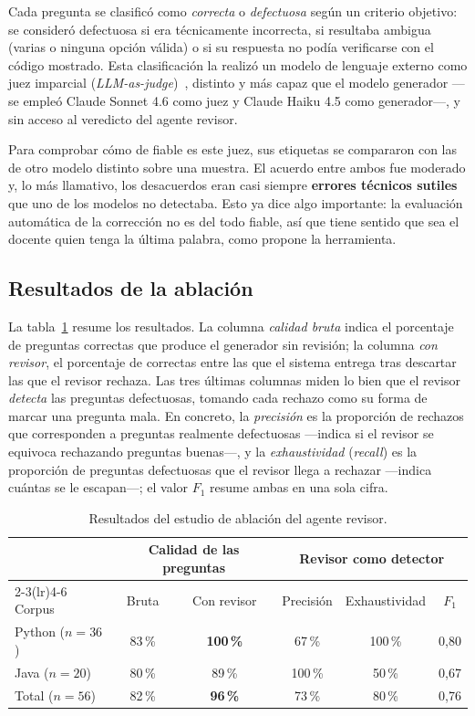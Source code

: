 Cada pregunta se clasificó como \emph{correcta} o \emph{defectuosa} según un
criterio objetivo: se consideró defectuosa si era técnicamente incorrecta, si
resultaba ambigua (varias o ninguna opción válida) o si su respuesta no podía
verificarse con el código mostrado. Esta clasificación la realizó un modelo de
lenguaje externo como juez imparcial
(\emph{LLM-as-judge})~\parencite{zheng2023llmjudge}, distinto y más capaz que el
modelo generador ---se empleó Claude Sonnet 4.6 como juez y Claude Haiku 4.5
como generador---, y sin acceso al veredicto del agente revisor.

Para comprobar cómo de fiable es este juez, sus etiquetas se compararon con las
de otro modelo distinto sobre una muestra. El
acuerdo entre ambos fue moderado y, lo más llamativo, los desacuerdos eran casi
siempre \textbf{errores técnicos sutiles} que uno de los modelos no detectaba.
Esto ya dice algo importante: la
evaluación automática de la corrección no es del todo fiable, así que tiene
sentido que sea el docente quien tenga la última palabra, como propone la
herramienta.

\subsection{Resultados de la ablación}
\label{sec:res-ablacion-datos}

La tabla~\ref{tab:ablacion} resume los resultados. La columna \emph{calidad
bruta} indica el porcentaje de preguntas correctas que produce el generador sin
revisión; la columna \emph{con revisor}, el porcentaje de correctas entre las
que el sistema entrega tras descartar las que el revisor rechaza. Las tres
últimas columnas miden lo bien que el revisor \emph{detecta} las preguntas
defectuosas, tomando cada rechazo como su forma de marcar una pregunta mala. En
concreto, la \emph{precisión} es la proporción de rechazos que corresponden a
preguntas realmente defectuosas ---indica si el revisor se equivoca rechazando
preguntas buenas---, y la \emph{exhaustividad} (\emph{recall}) es la proporción
de preguntas defectuosas que el revisor llega a rechazar ---indica cuántas se le
escapan---; el valor $F_1$ resume ambas en una sola cifra.

\begin{table}[htbp]
  \centering
  \caption{Resultados del estudio de ablación del agente revisor.}
  \label{tab:ablacion}
  \begin{tabular}{lccccc}
    \toprule
    & \multicolumn{2}{c}{Calidad de las preguntas} & \multicolumn{3}{c}{Revisor como detector} \\
    \cmidrule(lr){2-3}\cmidrule(lr){4-6}
    Corpus & Bruta & Con revisor & Precisión & Exhaustividad & $F_1$ \\
    \midrule
    Python ($n=36$) & 83\,\% & \textbf{100\,\%} & 67\,\% & 100\,\% & 0{,}80 \\
    Java ($n=20$)   & 80\,\% & 89\,\%           & 100\,\% & 50\,\% & 0{,}67 \\
    \midrule
    Total ($n=56$)  & 82\,\% & \textbf{96\,\%}  & 73\,\% & 80\,\% & 0{,}76 \\
    \bottomrule
  \end{tabular}
\end{table}

